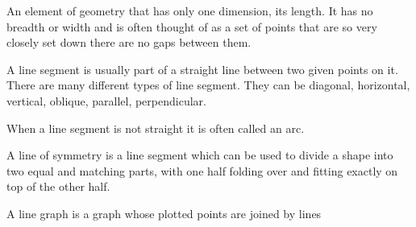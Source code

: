 An element of geometry that has only one dimension, its length.  
It has no breadth or width and is often thought of as a set of points that are so 
very closely set down there are no gaps between them.
 
\par
A line segment is usually part of a straight line between two given points on it.  
There are many different types of line segment.  They can be diagonal, horizontal, 
vertical, oblique,  parallel, perpendicular. 

\par
When a line segment is not straight it is often called an arc. 

\par
A line of symmetry is a line segment which can be used to divide a shape into 
two equal and matching parts, with one half folding over and fitting exactly on top 
of the other half.

\par
A line graph is a graph whose plotted points are joined by lines